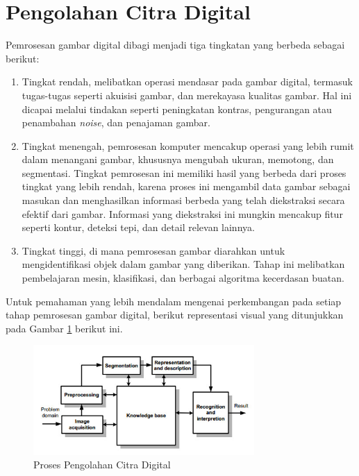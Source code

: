    


\section{Pengolahan Citra Digital}

    Pemrosesan gambar digital dibagi menjadi tiga tingkatan yang berbeda sebagai berikut: 

    \begin{enumerate}
    
        \item  Tingkat rendah, melibatkan operasi mendasar pada gambar digital, termasuk tugas-tugas seperti akuisisi gambar, dan merekayasa kualitas gambar. Hal ini dicapai melalui tindakan seperti peningkatan kontras, pengurangan atau penambahan \textit{noise}, dan penajaman gambar.

        \item  Tingkat menengah, pemrosesan komputer mencakup operasi yang lebih rumit dalam menangani gambar, khususnya mengubah ukuran, memotong, dan segmentasi. Tingkat pemrosesan ini memiliki hasil yang berbeda dari proses tingkat yang lebih rendah, karena proses ini mengambil data gambar sebagai masukan dan menghasilkan informasi berbeda yang telah diekstraksi secara efektif dari gambar. Informasi yang diekstraksi ini mungkin mencakup fitur seperti kontur, deteksi tepi, dan detail relevan lainnya.

        \item Tingkat tinggi, di mana pemrosesan gambar diarahkan untuk mengidentifikasi objek dalam gambar yang diberikan. Tahap ini  melibatkan pembelajaran mesin, klasifikasi, dan berbagai algoritma kecerdasan buatan.

    \end{enumerate}
    
    
    
  Untuk pemahaman yang lebih mendalam mengenai perkembangan pada setiap tahap pemrosesan gambar digital, berikut representasi visual yang ditunjukkan pada Gambar \ref{Proses Dalam Pengolahan Citra Digital} berikut ini.


    \begin{figure}[H]
    \centering
    \includegraphics[width=0.75\textwidth]{figures/bab2/Block-diagram.jpg}
    \caption{Proses Pengolahan Citra Digital \cite{sathiya2017novel}}
    \label{Proses Dalam Pengolahan Citra Digital}
\end{figure}

